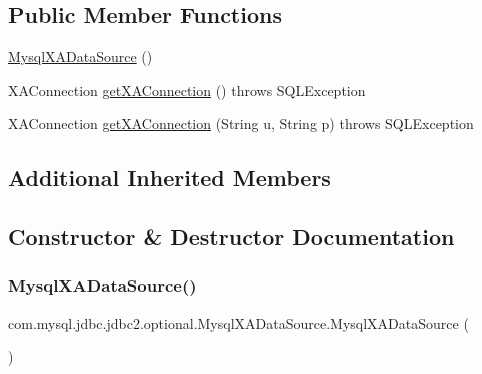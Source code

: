 \subsection*{Public Member Functions}
\begin{DoxyCompactItemize}
\item 
\mbox{\hyperlink{classcom_1_1mysql_1_1jdbc_1_1jdbc2_1_1optional_1_1_mysql_x_a_data_source_a29f2206bc1ba5bc00ab6f0ff78cb1103}{Mysql\+X\+A\+Data\+Source}} ()
\item 
X\+A\+Connection \mbox{\hyperlink{classcom_1_1mysql_1_1jdbc_1_1jdbc2_1_1optional_1_1_mysql_x_a_data_source_a767e7d22d5ab6144aac907e6f0a1114b}{get\+X\+A\+Connection}} ()  throws S\+Q\+L\+Exception 
\item 
X\+A\+Connection \mbox{\hyperlink{classcom_1_1mysql_1_1jdbc_1_1jdbc2_1_1optional_1_1_mysql_x_a_data_source_a761134f83e2cba1ce06abd3185720691}{get\+X\+A\+Connection}} (String u, String p)  throws S\+Q\+L\+Exception 
\end{DoxyCompactItemize}
\subsection*{Additional Inherited Members}


\subsection{Constructor \& Destructor Documentation}
\mbox{\label{classcom_1_1mysql_1_1jdbc_1_1jdbc2_1_1optional_1_1_mysql_x_a_data_source_a29f2206bc1ba5bc00ab6f0ff78cb1103}} 
\subsubsection{\texorpdfstring{Mysql\+X\+A\+Data\+Source()}{MysqlXADataSource()}}
{\footnotesize\ttfamily com.\+mysql.\+jdbc.\+jdbc2.\+optional.\+Mysql\+X\+A\+Data\+Source.\+Mysql\+X\+A\+Data\+Source (\begin{DoxyParamCaption}{ }\end{DoxyParamCaption})}

